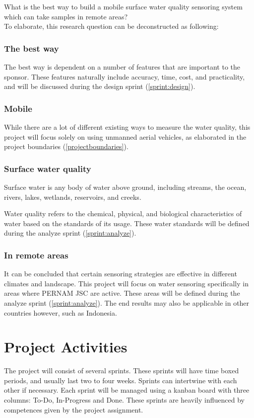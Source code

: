 \documentclass[11pt, a4paper]{article}
\begin{document}
\large{What is the best way to build a mobile surface water quality sensoring system which can take samples in remote areas?}\vspace{3mm}\\
\normalsize
To elaborate, this research question can be deconstructed as following:

\subsubsection{The best way}
The best way is dependent on a number of features that are important to the sponsor. These features naturally include accuracy, time, cost, and practicality, and will be discussed during the design sprint (\ref{sprint:design}).

\subsubsection{Mobile}
While there are a lot of different existing ways to measure the water quality, this project will focus solely on using unmanned aerial vehicles, as elaborated in the project boundaries (\ref{projectboundaries}).

\subsubsection{Surface water quality}
Surface water is any body of water above ground, including streams, the ocean, rivers, lakes, wetlands, reservoirs, and creeks.\cite{surfacewater}

Water quality refers to the chemical, physical, and biological characteristics of water based on the standards of its usage. These water standards will be defined during the analyze sprint (\ref{sprint:analyze}).

\subsubsection{In remote areas}
It can be concluded that certain sensoring strategies are effective in different climates and landscape. This project will focus on water sensoring specifically in areas where PERNAM JSC are active. These areas will be defined during the analyze sprint (\ref{sprint:analyze}). The end results may also be applicable in other countries however, such as Indonesia.

\section{Project Activities} \label{projectactivities}
The project will consist of several sprints. These sprints will have time boxed periods, and usually last two to four weeks. Sprints can intertwine with each other if necessary. Each sprint will be managed using a kanban \cite{kanban} board with three columns: To-Do, In-Progress and Done. These sprints are heavily influenced by competences given by the project assignment. \cite{assignmentform}
\end{document}
